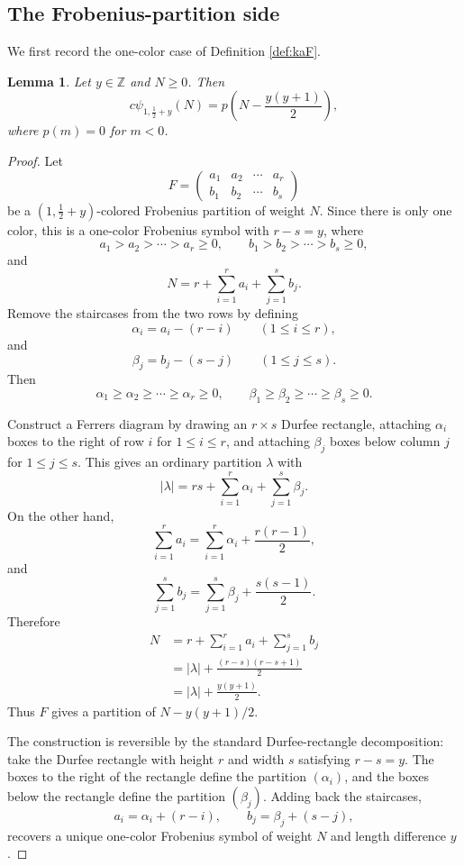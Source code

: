 \documentclass[12pt]{amsart}
\newtheorem{lemma}[theorem]{Lemma}
\theoremstyle{definition}
\theoremstyle{remark}
\numberwithin{equation}{section}
\newcommand{\cpsi}{c\psi}
\begin{document}
\subsection{The Frobenius-partition side}

We first record the one-color case of Definition \ref{def:kaF}.

\begin{lemma}\label{lemma.durfee}
Let $y\in\mathbb Z$ and $N\geq 0$.  Then
\[
\cpsi_{1,\frac12+y}(N)=p\left(N-\frac{y(y+1)}2\right),
\]
where $p(m)=0$ for $m<0$.
\end{lemma}

\begin{proof}
Let
\[
F=
\begin{pmatrix}
 a_1&a_2&\cdots&a_r\\
 b_1&b_2&\cdots&b_s
\end{pmatrix}
\]
be a $(1,\frac12+y)$-colored Frobenius partition of weight $N$.  Since there is only one color, this is a one-color Frobenius symbol with $r-s=y$, where
\[
a_1>a_2>\cdots>a_r\geq 0,
\qquad
b_1>b_2>\cdots>b_s\geq 0,
\]
and
\[
N=r+\sum_{i=1}^{r}a_i+\sum_{j=1}^{s}b_j.
\]
Remove the staircases from the two rows by defining
\[
\alpha_i=a_i-(r-i)\qquad(1\leq i\leq r),
\]
and
\[
\beta_j=b_j-(s-j)\qquad(1\leq j\leq s).
\]
Then
\[
\alpha_1\geq\alpha_2\geq\cdots\geq\alpha_r\geq 0,
\qquad
\beta_1\geq\beta_2\geq\cdots\geq\beta_s\geq 0.
\]

Construct a Ferrers diagram by drawing an $r\times s$ Durfee rectangle, attaching $\alpha_i$ boxes to the right of row $i$ for $1\leq i\leq r$, and attaching $\beta_j$ boxes below column $j$ for $1\leq j\leq s$.  This gives an ordinary partition $\lambda$ with
\[
|\lambda|=rs+\sum_{i=1}^{r}\alpha_i+\sum_{j=1}^{s}\beta_j.
\]
On the other hand,
\[
\sum_{i=1}^{r}a_i=
\sum_{i=1}^{r}\alpha_i+\frac{r(r-1)}2,
\]
and
\[
\sum_{j=1}^{s}b_j=
\sum_{j=1}^{s}\beta_j+\frac{s(s-1)}2.
\]
Therefore
\begin{align*}
N
&=r+\sum_{i=1}^{r}a_i+\sum_{j=1}^{s}b_j\\
&=|\lambda|+\frac{(r-s)(r-s+1)}2\\
&=|\lambda|+\frac{y(y+1)}2.
\end{align*}
Thus $F$ gives a partition of $N-y(y+1)/2$.

The construction is reversible by the standard Durfee-rectangle decomposition: take the Durfee rectangle with height $r$ and width $s$ satisfying $r-s=y$.  The boxes to the right of the rectangle define the partition $(\alpha_i)$, and the boxes below the rectangle define the partition $(\beta_j)$.  Adding back the staircases,
\[
a_i=\alpha_i+(r-i),
\qquad
b_j=\beta_j+(s-j),
\]
recovers a unique one-color Frobenius symbol of weight $N$ and length difference $y$.
\end{proof}
\end{document}
